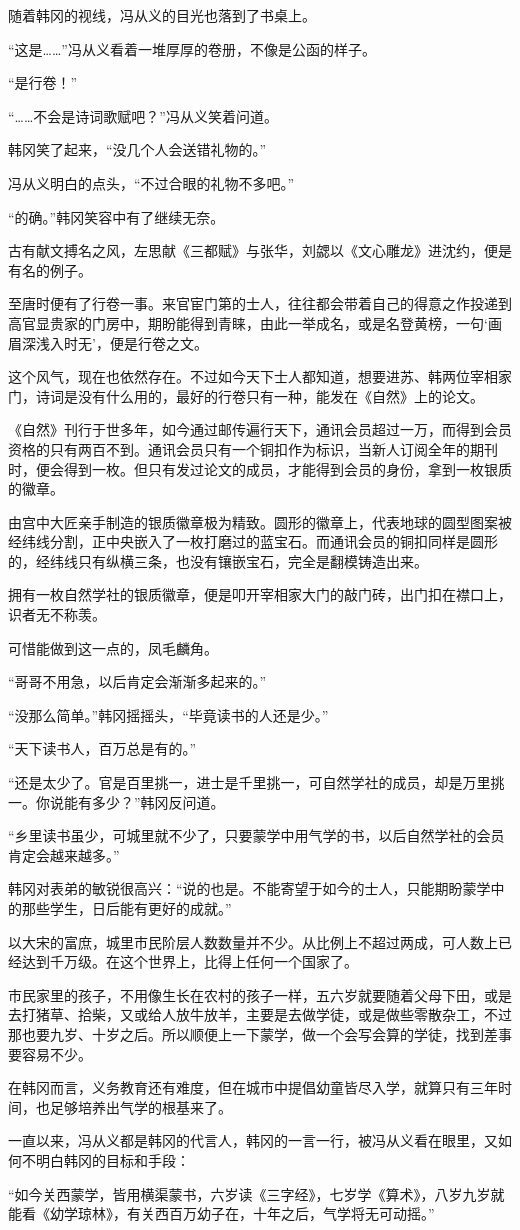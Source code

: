 随着韩冈的视线，冯从义的目光也落到了书桌上。

“这是……”冯从义看着一堆厚厚的卷册，不像是公函的样子。

“是行卷！”

“……不会是诗词歌赋吧？”冯从义笑着问道。

韩冈笑了起来，“没几个人会送错礼物的。”

冯从义明白的点头，“不过合眼的礼物不多吧。”

“的确。”韩冈笑容中有了继续无奈。

古有献文搏名之风，左思献《三都赋》与张华，刘勰以《文心雕龙》进沈约，便是有名的例子。

至唐时便有了行卷一事。来官宦门第的士人，往往都会带着自己的得意之作投递到高官显贵家的门房中，期盼能得到青睐，由此一举成名，或是名登黄榜，一句‘画眉深浅入时无’，便是行卷之文。

这个风气，现在也依然存在。不过如今天下士人都知道，想要进苏、韩两位宰相家门，诗词是没有什么用的，最好的行卷只有一种，能发在《自然》上的论文。

《自然》刊行于世多年，如今通过邮传遍行天下，通讯会员超过一万，而得到会员资格的只有两百不到。通讯会员只有一个铜扣作为标识，当新人订阅全年的期刊时，便会得到一枚。但只有发过论文的成员，才能得到会员的身份，拿到一枚银质的徽章。

由宫中大匠亲手制造的银质徽章极为精致。圆形的徽章上，代表地球的圆型图案被经纬线分割，正中央嵌入了一枚打磨过的蓝宝石。而通讯会员的铜扣同样是圆形的，经纬线只有纵横三条，也没有镶嵌宝石，完全是翻模铸造出来。

拥有一枚自然学社的银质徽章，便是叩开宰相家大门的敲门砖，出门扣在襟口上，识者无不称羡。

可惜能做到这一点的，凤毛麟角。

“哥哥不用急，以后肯定会渐渐多起来的。”

“没那么简单。”韩冈摇摇头，“毕竟读书的人还是少。”

“天下读书人，百万总是有的。”

“还是太少了。官是百里挑一，进士是千里挑一，可自然学社的成员，却是万里挑一。你说能有多少？”韩冈反问道。

“乡里读书虽少，可城里就不少了，只要蒙学中用气学的书，以后自然学社的会员肯定会越来越多。”

韩冈对表弟的敏锐很高兴：“说的也是。不能寄望于如今的士人，只能期盼蒙学中的那些学生，日后能有更好的成就。”

以大宋的富庶，城里市民阶层人数数量并不少。从比例上不超过两成，可人数上已经达到千万级。在这个世界上，比得上任何一个国家了。

市民家里的孩子，不用像生长在农村的孩子一样，五六岁就要随着父母下田，或是去打猪草、拾柴，又或给人放牛放羊，主要是去做学徒，或是做些零散杂工，不过那也要九岁、十岁之后。所以顺便上一下蒙学，做一个会写会算的学徒，找到差事要容易不少。

在韩冈而言，义务教育还有难度，但在城市中提倡幼童皆尽入学，就算只有三年时间，也足够培养出气学的根基来了。

一直以来，冯从义都是韩冈的代言人，韩冈的一言一行，被冯从义看在眼里，又如何不明白韩冈的目标和手段：

“如今关西蒙学，皆用横渠蒙书，六岁读《三字经》，七岁学《算术》，八岁九岁就能看《幼学琼林》，有关西百万幼子在，十年之后，气学将无可动摇。”

